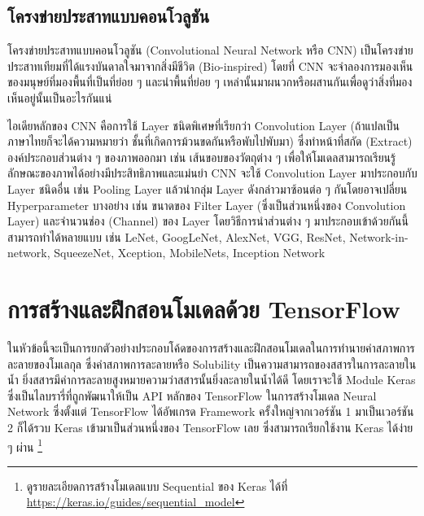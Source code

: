 \subsection{โครงข่ายประสาทแบบคอนโวลูชัน}
\label{ssec:cnn}

โครงข่ายประสาทแบบคอนโวลูชัน (Convolutional Neural Network หรือ CNN)\autocite{alzubaidi2021} เป็นโครงข่ายประสาทเทียมที่ได้แรงบันดาลใจมาจากสิ่งมีชีวิต (Bio-inspired) โดยที่ CNN จะจำลองการมองเห็นของมนุษย์ที่มองพื้นที่เป็นที่ย่อย ๆ และนำพื้นที่ย่อย ๆ เหล่านั้นมาผนวกหรือผสานกันเพื่อดูว่าสิ่งที่มองเห็นอยู่นั้นเป็นอะไรกันแน่

ไอเดียหลักของ CNN คือการใช้ Layer ชนิดพิเศษที่เรียกว่า Convolution Layer (ถ้าแปลเป็นภาษาไทยก็จะได้ความหมายว่า ชั้นที่เกิดการม้วนขดกันหรือพับไปพับมา) ซึ่งทำหน้าที่สกัด (Extract) องค์ประกอบส่วนต่าง ๆ ของภาพออกมา เช่น เส้นขอบของวัตถุต่าง ๆ เพื่อให้โมเดลสามารถเรียนรู้ลักษณะของภาพได้อย่างมีประสิทธิภาพและแม่นยำ CNN จะใช้ Convolution Layer มาประกอบกับ Layer ชนิดอื่น เช่น Pooling Layer แล้วนำกลุ่ม Layer ดังกล่าวมาซ้อนต่อ ๆ กันโดยอาจเปลี่ยน Hyperparameter บางอย่าง เช่น ขนาดของ Filter Layer (ซึ่งเป็นส่วนหนึ่งของ Convolution Layer) และจำนวนช่อง (Channel) ของ Layer โดยวิธีการนำส่วนต่าง ๆ มาประกอบเข้าด้วยกันนี้สามารถทำได้หลายแบบ เช่น LeNet, GoogLeNet, AlexNet, VGG, ResNet, Network-in-network, SqueezeNet, Xception, MobileNets, Inception Network

\section{การสร้างและฝึกสอนโมเดลด้วย TensorFlow}
\label{sec:train_tf}

ในหัวข้อนี้จะเป็นการยกตัวอย่างประกอบโค้ดของการสร้างและฝึกสอนโมเดลในการทำนายค่าสภาพการละลายของโมเลกุล ซึ่งค่าสภาพการละลายหรือ Solubility เป็นความสามารถของสสารในการละลายในน้ำ ยิ่งสสารมีค่าการละลายสูงหมายความว่าสสารนั้นยิ่งละลายในน้ำได้ดี โดยเราจะใช้ Module Keras ซึ่งเป็นไลบรารี่ที่ถูกพัฒนาให้เป็น API หลักของ TensorFlow ในการสร้างโมเดล Neural Network ซึ่งตั้งแต่ TensorFlow ได้อัพเกรด Framework ครั้งใหญ่จากเวอร์ชัน 1 มาเป็นเวอร์ชัน 2 ก็ได้รวบ Keras เข้ามาเป็นส่วนหนึ่งของ TensorFlow เลย ซึ่งสามารถเรียกใช้งาน Keras ได้ง่าย ๆ ผ่าน \footnote{ดูรายละเอียดการสร้างโมเดลแบบ Sequential ของ Keras ได้ที่ \url{https://keras.io/guides/sequential_model}}


